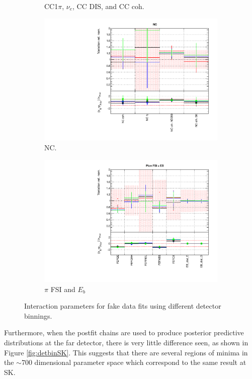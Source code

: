 \begin{figure}
\begin{subfigure}{0.49\textwidth}
  \caption{CC1$\pi$, $\nu_e$, CC DIS, and CC coh.}
\end{subfigure}
\begin{subfigure}{0.49\textwidth}
  \centering
  \includegraphics[width=0.95\linewidth]{figs/detcovbinxsec_3}
  \caption{NC.}
\end{subfigure}
\begin{subfigure}{0.49\textwidth}
  \centering
  \includegraphics[width=0.95\linewidth]{figs/detcovbinxsec_4}
  \caption{$\pi$ FSI and $E_b$}
\end{subfigure}
\caption{Interaction parameters for fake data fits using different detector binnings.}
\label{fig:detcovbinxsec}
\end{figure}

Furthermore, when the postfit chains are used to produce posterior predictive distributions at the far detector, there is very little difference seen, as shown in Figure \ref{fig:detbinSK}. This suggests that there are several regions of minima in the $\sim$700 dimensional parameter space which correspond to the same result at SK. 

